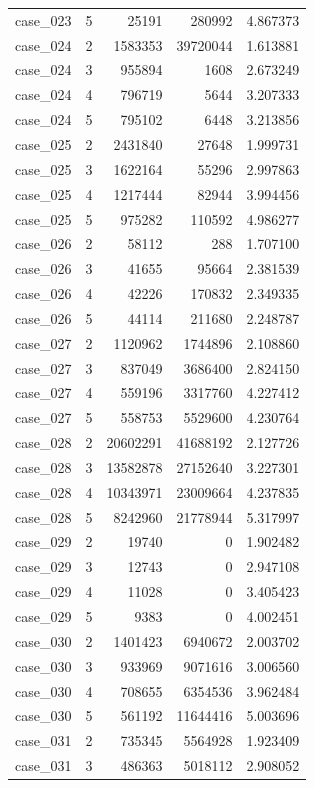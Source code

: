 \begin{longtable}{lrrrr}
case\_023 & 5 & 25191 & 280992 & 4.867373 \\
case\_024 & 2 & 1583353 & 39720044 & 1.613881 \\
case\_024 & 3 & 955894 & 1608 & 2.673249 \\
case\_024 & 4 & 796719 & 5644 & 3.207333 \\
case\_024 & 5 & 795102 & 6448 & 3.213856 \\
case\_025 & 2 & 2431840 & 27648 & 1.999731 \\
case\_025 & 3 & 1622164 & 55296 & 2.997863 \\
case\_025 & 4 & 1217444 & 82944 & 3.994456 \\
case\_025 & 5 & 975282 & 110592 & 4.986277 \\
case\_026 & 2 & 58112 & 288 & 1.707100 \\
case\_026 & 3 & 41655 & 95664 & 2.381539 \\
case\_026 & 4 & 42226 & 170832 & 2.349335 \\
case\_026 & 5 & 44114 & 211680 & 2.248787 \\
case\_027 & 2 & 1120962 & 1744896 & 2.108860 \\
case\_027 & 3 & 837049 & 3686400 & 2.824150 \\
case\_027 & 4 & 559196 & 3317760 & 4.227412 \\
case\_027 & 5 & 558753 & 5529600 & 4.230764 \\
case\_028 & 2 & 20602291 & 41688192 & 2.127726 \\
case\_028 & 3 & 13582878 & 27152640 & 3.227301 \\
case\_028 & 4 & 10343971 & 23009664 & 4.237835 \\
case\_028 & 5 & 8242960 & 21778944 & 5.317997 \\
case\_029 & 2 & 19740 & 0 & 1.902482 \\
case\_029 & 3 & 12743 & 0 & 2.947108 \\
case\_029 & 4 & 11028 & 0 & 3.405423 \\
case\_029 & 5 & 9383 & 0 & 4.002451 \\
case\_030 & 2 & 1401423 & 6940672 & 2.003702 \\
case\_030 & 3 & 933969 & 9071616 & 3.006560 \\
case\_030 & 4 & 708655 & 6354536 & 3.962484 \\
case\_030 & 5 & 561192 & 11644416 & 5.003696 \\
case\_031 & 2 & 735345 & 5564928 & 1.923409 \\
case\_031 & 3 & 486363 & 5018112 & 2.908052 \\

\end{longtable}
